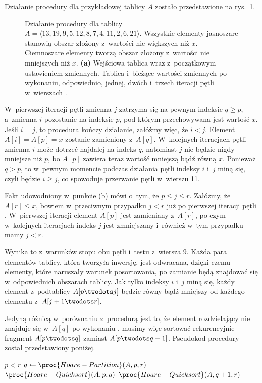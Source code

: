 
\subproblem %
Działanie procedury  dla przykładowej tablicy $A$ zostało przedstawione na rys.\ \ref{fig:7-1a}.
\begin{figure}[!ht]
	\centering 
	\caption{Działanie procedury  dla tablicy $A=\langle13,19,9,5,12,8,7,4,11,2,6,21\rangle$.
Wszystkie elementy jasnoszare stanowią obszar złożony z~wartości nie większych niż $x$.
Ciemnoszare elementy tworzą obszar złożony z~wartości nie mniejszych niż $x$.
{\sffamily\bfseries(a)} Wejściowa tablica wraz z~początkowym ustawieniem zmiennych.
{\sffamily\bfseries{}} Tablica i~bieżące wartości zmiennych po wykonaniu, odpowiednio, jednej, dwóch i~trzech iteracji pętli  w~wierszach .} \label{fig:7-1a}
\end{figure}

\subproblem %
W~pierwszej iteracji pętli  zmienna $j$ zatrzyma się na pewnym indeksie $q\ge p$, a~zmienna $i$ pozostanie na indeksie $p$, pod którym przechowywana jest wartość $x$.
Jeśli $i=j$, to procedura kończy działanie, załóżmy więc, że $i<j$.
Element $A[i]=A[p]=x$ zostanie zamieniony z~$A[q]$.
W~kolejnych iteracjach pętli  zmienna $i$ może dotrzeć najdalej na indeks $q$, natomiast $j$ nie będzie nigdy mniejsze niż $p$, bo $A[p]$ zawiera teraz wartość mniejszą bądź równą $x$.
Ponieważ $q>p$, to w~pewnym momencie podczas działania pętli indeksy $i$ i~$j$ miną się, czyli będzie $i\ge j$, co spowoduje przerwanie pętli w~wierszu 11.

\subproblem %

\noindent Fakt udowodniony w~punkcie (b) mówi o~tym, że $p\le j\le r$.
Załóżmy, że $A[r]\le x$, bowiem w~przeciwnym przypadku $j<r$ już po pierwszej iteracji pętli .
W~pierwszej iteracji element $A[p]$ jest zamieniany z~$A[r]$, po czym w~kolejnych iteracjach indeks $j$ jest zmniejszany i~również w~tym przypadku mamy $j<r$.

\subproblem %
Wynika to z~warunków stopu obu pętli  i~testu z~wiersza 9.
Każda para elementów tablicy, która tworzyła inwersję, jest odwracana, dzięki czemu elementy, które naruszały warunek posortowania, po zamianie będą znajdować się w~odpowiednich obszarach tablicy.
Jak tylko indeksy $i$ i~$j$ miną się, każdy element z~podtablicy $A[p\twodots j]$ będzie równy bądź mniejszy od każdego elementu z~$A[j+1\twodots r]$.

\subproblem %
Jedyną różnicą w~porównaniu z~procedurą  jest to, że element rozdzielający nie znajduje się w~$A[q]$ po wykonaniu , musimy więc sortować rekurencyjnie fragment $A[p\twodots q]$ zamiast $A[p\twodots q-1]$.
Pseudokod procedury został przedstawiony poniżej.
\begin{codebox}
\li	\If $p<r$
\li		\Then
			$q\gets\proc{Hoare-Partition}(A,p,r)$
\li			$\proc{Hoare-Quicksort}(A,p,q)$
\li			$\proc{Hoare-Quicksort}(A,q+1,r)$
		\End
\end{codebox}

